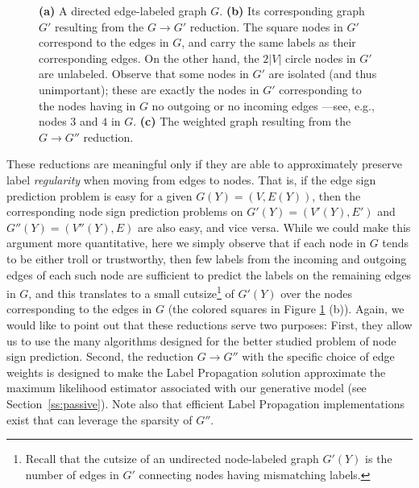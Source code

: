 \begin{figure}[t]
\begin{subfigure}[b]{0.36\textwidth}
  \end{subfigure}
\caption{\label{f:etnr}
{\bf (a)} A directed edge-labeled graph $G$. {\bf (b)} Its corresponding graph $G'$ resulting from the $G\rightarrow G'$ reduction. The square nodes in $G'$ correspond to the edges in $G$, and carry the same labels as their corresponding edges. On the other hand, the $2|V|$ circle nodes in $G'$ are unlabeled. Observe that some nodes in $G'$ are isolated (and thus unimportant); these are exactly the nodes in $G'$ corresponding to the nodes having in $G$ no outgoing or no incoming edges ---see, e.g., nodes $3$ and $4$ in $G$. {\bf (c)} The weighted graph resulting from the $G\rightarrow G''$ reduction.
}
\end{figure}

These reductions are meaningful only if they are able to approximately preserve 
label {\em regularity} when moving from edges to nodes. That is, if the edge sign prediction problem is easy for a given $G(Y) = (V,E(Y))$, then the corresponding node sign prediction problems on $G'(Y) = (V'(Y),E')$ and $G''(Y) = (V''(Y),E)$ are also easy, and vice versa.
While we could make this argument more quantitative, here we simply observe that if each node in $G$ tends to be either troll or trustworthy, then few labels from the incoming and outgoing edges of each such node are sufficient to predict the labels on the remaining edges in $G$, and this translates to a small cutsize\footnote
{
Recall that the cutsize of an undirected node-labeled graph $G'(Y)$ is the number of edges in $G'$ connecting nodes having mismatching labels. 
}
of $G'(Y)$ over the nodes corresponding to the edges in $G$ (the colored squares in Figure \ref{f:etnr} (b)).
%
Again, we would like to point out that these reductions serve two purposes: %
First, they allow us to use the many algorithms designed for the better studied problem of node sign prediction. Second, the reduction $G\rightarrow G''$ with the specific choice of edge weights is designed to make the Label Propagation solution approximate the maximum likelihood estimator associated with our generative model (see Section~\ref{ss:passive}).%
Note also that efficient Label Propagation implementations exist that can leverage the sparsity of $G''$.

